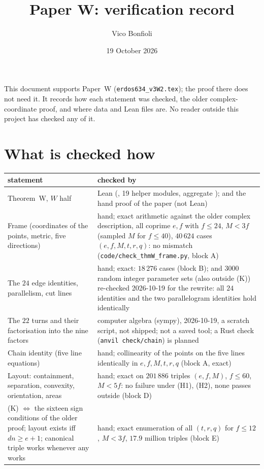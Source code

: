 \documentclass[11pt,reqno]{amsart}
\title{Paper W: verification record}
\author{Vico Bonfioli}
\date{19 October 2026}
\newcommand{\lean}[1]{\texttt{\detokenize{#1}}}
\begin{document}
\maketitle
This document supports Paper~W (\texttt{erdos634\_v3W2.tex}); the proof there does not need it. It records how each statement was checked, the older complex-coordinate proof, and where data and Lean files are. No reader outside this project has checked any of it.

\section{What is checked how}
\begin{center}\small
\begin{tabular}{@{}p{5.6cm}p{7.0cm}@{}}
\toprule
statement & checked by\\
\midrule
Theorem~W, $W$ half & Lean (\lean{Draft.ThmW.thmW}, 19 helper modules, aggregate \lean{Erdos634.AllThmW}); and the hand proof of the paper (not Lean)\\
Frame (coordinates of the points, metric, five directions) & hand; exact arithmetic against the older complex description, all coprime $e,f$ with $f\le24$, $M<3f$ (sampled $M$ for $f\le40$), $40\,624$ cases $(e,f,M,t,r,q)$: no mismatch (\texttt{code/check\_thmW\_frame.py}, block A)\\
The $24$ edge identities, parallelism, cut lines & hand; exact: $18\,276$ cases (block B); and $3000$ random integer parameter sets (also outside (K)) re-checked 2026-10-19 for the rewrite: all $24$ identities and the two parallelogram identities hold identically\\
The $22$ turns and their factorisation into the nine factors & computer algebra (sympy), 2026-10-19, a scratch script, not shipped; not a saved tool; a Rust check (\texttt{anvil check/chain}) is planned\\
Chain identity (five line equations) & hand; collinearity of the points on the five lines identically in $e,f,M,t,r,q$ (block A, exact)\\
Layout: containment, separation, convexity, orientation, areas & hand; exact on $201\,886$ triples $(e,f,M)$, $f\le60$, $M<5f$: no failure under (H1), (H2), none passes outside (block D)\\
(K) $\Leftrightarrow$ the sixteen sign conditions of the older proof; layout exists iff $dn\ge e+1$; canonical triple works whenever any works & hand; exact enumeration of all $(t,r,q)$ for $f\le12$, $M<3f$, $17.9$ million triples (block E)\\

\end{tabular}
\end{center}
\end{document}
